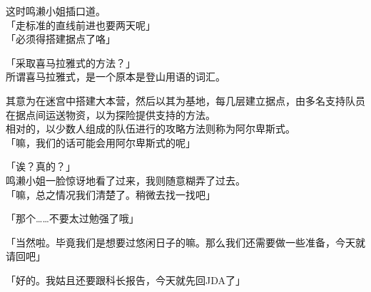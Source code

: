 这时鸣濑小姐插口道。\\

「走标准的直线前进也要两天呢」\\

「必须得搭建据点了咯」

「采取喜马拉雅式的方法？」\\

所谓喜马拉雅式，是一个原本是登山用语的词汇。

其意为在迷宫中搭建大本营，然后以其为基地，每几层建立据点，由多名支持队员在据点间运送物资，以为探险提供支持的方法。\\

相对的，以少数人组成的队伍进行的攻略方法则称为阿尔卑斯式。\\

「嘛，我们的话可能会用阿尔卑斯式的呢」

「诶？真的？」\\

鸣濑小姐一脸惊讶地看了过来，我则随意糊弄了过去。\\

「嘛，总之情况我们清楚了。稍微去找一找吧」

「那个……不要太过勉强了哦」

「当然啦。毕竟我们是想要过悠闲日子的嘛。那么我们还需要做一些准备，今天就请回吧」

「好的。我姑且还要跟科长报告，今天就先回JDA了」

